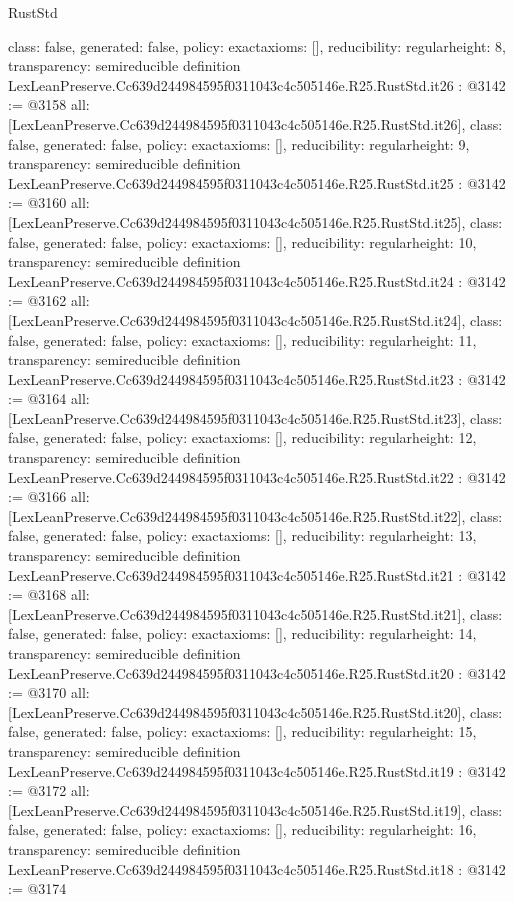 \begin{lexlean}{RustStd}
\begin{coremodule}
{  class: false,
  generated: false,
  policy: exact{axioms: []},
  reducibility: regular{height: 8},
  transparency: semireducible
}
definition LexLeanPreserve.Cc639d244984595f0311043c4c505146e.R25.RustStd.it26 : @3142 := @3158 {
  all: [LexLeanPreserve.Cc639d244984595f0311043c4c505146e.R25.RustStd.it26],
  class: false,
  generated: false,
  policy: exact{axioms: []},
  reducibility: regular{height: 9},
  transparency: semireducible
}
definition LexLeanPreserve.Cc639d244984595f0311043c4c505146e.R25.RustStd.it25 : @3142 := @3160 {
  all: [LexLeanPreserve.Cc639d244984595f0311043c4c505146e.R25.RustStd.it25],
  class: false,
  generated: false,
  policy: exact{axioms: []},
  reducibility: regular{height: 10},
  transparency: semireducible
}
definition LexLeanPreserve.Cc639d244984595f0311043c4c505146e.R25.RustStd.it24 : @3142 := @3162 {
  all: [LexLeanPreserve.Cc639d244984595f0311043c4c505146e.R25.RustStd.it24],
  class: false,
  generated: false,
  policy: exact{axioms: []},
  reducibility: regular{height: 11},
  transparency: semireducible
}
definition LexLeanPreserve.Cc639d244984595f0311043c4c505146e.R25.RustStd.it23 : @3142 := @3164 {
  all: [LexLeanPreserve.Cc639d244984595f0311043c4c505146e.R25.RustStd.it23],
  class: false,
  generated: false,
  policy: exact{axioms: []},
  reducibility: regular{height: 12},
  transparency: semireducible
}
definition LexLeanPreserve.Cc639d244984595f0311043c4c505146e.R25.RustStd.it22 : @3142 := @3166 {
  all: [LexLeanPreserve.Cc639d244984595f0311043c4c505146e.R25.RustStd.it22],
  class: false,
  generated: false,
  policy: exact{axioms: []},
  reducibility: regular{height: 13},
  transparency: semireducible
}
definition LexLeanPreserve.Cc639d244984595f0311043c4c505146e.R25.RustStd.it21 : @3142 := @3168 {
  all: [LexLeanPreserve.Cc639d244984595f0311043c4c505146e.R25.RustStd.it21],
  class: false,
  generated: false,
  policy: exact{axioms: []},
  reducibility: regular{height: 14},
  transparency: semireducible
}
definition LexLeanPreserve.Cc639d244984595f0311043c4c505146e.R25.RustStd.it20 : @3142 := @3170 {
  all: [LexLeanPreserve.Cc639d244984595f0311043c4c505146e.R25.RustStd.it20],
  class: false,
  generated: false,
  policy: exact{axioms: []},
  reducibility: regular{height: 15},
  transparency: semireducible
}
definition LexLeanPreserve.Cc639d244984595f0311043c4c505146e.R25.RustStd.it19 : @3142 := @3172 {
  all: [LexLeanPreserve.Cc639d244984595f0311043c4c505146e.R25.RustStd.it19],
  class: false,
  generated: false,
  policy: exact{axioms: []},
  reducibility: regular{height: 16},
  transparency: semireducible
}
definition LexLeanPreserve.Cc639d244984595f0311043c4c505146e.R25.RustStd.it18 : @3142 := @3174 {
}
\end{coremodule}
\end{lexlean}
